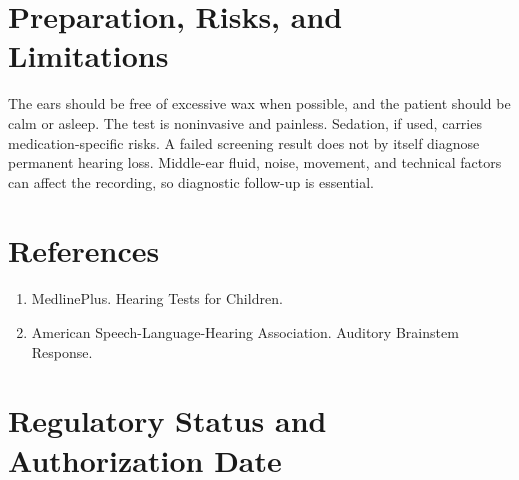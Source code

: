 \section*{Preparation, Risks, and Limitations}
The ears should be free of excessive wax when possible, and the patient should be calm or asleep. The test is noninvasive and painless. Sedation, if used, carries medication-specific risks. A failed screening result does not by itself diagnose permanent hearing loss. Middle-ear fluid, noise, movement, and technical factors can affect the recording, so diagnostic follow-up is essential.

\section*{References}
\begin{enumerate}
  \item MedlinePlus. Hearing Tests for Children.
  \item American Speech-Language-Hearing Association. Auditory Brainstem Response.
\end{enumerate}

\clearpage


\section*{Regulatory Status and Authorization Date}

\clearpage
